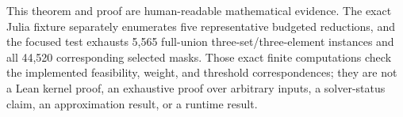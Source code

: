This theorem and proof are human-readable mathematical evidence. The exact
Julia fixture separately enumerates five representative budgeted reductions,
and the focused test exhausts 5,565 full-union three-set/three-element
instances and all 44,520 corresponding selected masks. Those exact finite
computations check the implemented feasibility, weight, and threshold
correspondences; they are not a Lean kernel proof, an exhaustive proof over
arbitrary inputs, a solver-status claim, an approximation result, or a runtime
result.
